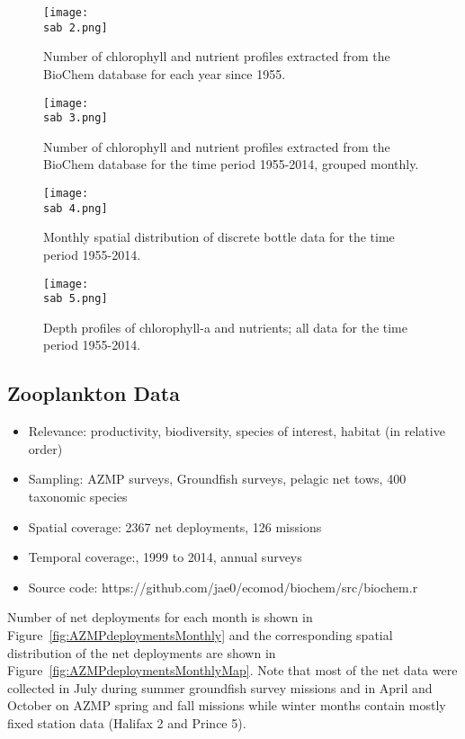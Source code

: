\documentclass[letterpaper,portrait,11pt]{scrartcl}
\numberwithin{equation}{section}		%
\numberwithin{figure}{section}		%
\numberwithin{table}{section}				%
\newcommand{\ecomod}{\string~/ecomod_data/}   %
\newcommand{\sab}{\ecomod/mpa/sab/}   %
\begin{document}
\begin{figure}
  \centering
  \texttt{[image: \\sab 2.png]}
  \caption{Number of chlorophyll and nutrient profiles extracted from the BioChem database for each year since 1955.}
    \label{fig:ChloroMap}
\end{figure}

\begin{figure}
  \centering
  \texttt{[image: \\sab 3.png]}
  \caption{Number of chlorophyll and nutrient profiles extracted from the BioChem database for the time period 1955-2014, grouped monthly.}
    \label{fig:ChloroFreq}
\end{figure}

\begin{figure}[h]
  \centering
  \texttt{[image: \\sab 4.png]}
  \caption{Monthly spatial distribution of discrete bottle data for the time period 1955-2014.}
   \label{fig:BottleMap}
\end{figure}

\begin{figure}
  \centering
  \texttt{[image: \\sab 5.png]}
  \caption{Depth profiles of chlorophyll-a and nutrients; all data for the time period 1955-2014.}
    \label{fig:ChloroProfiles}
\end{figure}


\subsection{Zooplankton Data}

\begin{itemize}  
  \item Relevance:  productivity, biodiversity, species of interest, habitat (in relative order)
  \item Sampling:  AZMP surveys, Groundfish surveys, pelagic net tows, 400 taxonomic species
  \item Spatial coverage: 2367 net deployments, 126 missions 
  \item Temporal coverage:,  1999 to 2014, annual surveys
  \item Source code: https://github.com/jae0/ecomod/biochem/src/biochem.r
\end{itemize}

Number of net deployments for each month is shown in Figure~\ref{fig:AZMPdeploymentsMonthly} and the corresponding spatial distribution of the net deployments are shown in Figure~\ref{fig:AZMPdeploymentsMonthlyMap}. Note that most of the net data were collected in July during summer groundfish survey missions and in April and October on AZMP spring and fall missions while winter months contain mostly fixed station data (Halifax 2 and Prince 5).
\end{document}
